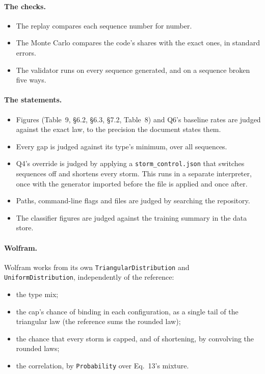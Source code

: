 \documentclass[11pt,a4paper]{article}
\begin{document}
\paragraph{The checks.}
\begin{itemize}[leftmargin=*,nosep]
\item The replay compares each sequence number for number.
\item The Monte Carlo compares the code's shares with the exact ones, in standard errors.
\item The validator runs on every sequence generated, and on a sequence broken five ways.
\end{itemize}

\paragraph{The statements.}
\begin{itemize}[leftmargin=*,nosep]
\item Figures (Table~9, \S6.2, \S6.3, \S7.2, Table~8) and Q6's baseline rates are judged
  against the exact law, to the precision the document states them.
\item Every gap is judged against its type's minimum, over all \bmReplayN{} sequences.
\item Q4's override is judged by applying a \texttt{storm\_control.json} that switches
  sequences off and shortens every storm. This runs in a separate interpreter, once with
  the generator imported before the file is applied and once after.
\item Paths, command-line flags and files are judged by searching the repository.
\item The classifier figures are judged against the training summary in the data store.
\end{itemize}

\paragraph{Wolfram.} Wolfram works from its own \texttt{TriangularDistribution} and
\texttt{UniformDistribution}, independently of the reference:
\begin{itemize}[leftmargin=*,nosep]
\item the type mix;
\item the cap's chance of binding in each configuration, as a single tail of the
  triangular law (the reference sums the rounded law);
\item the chance that every storm is capped, and of shortening, by convolving the rounded
  laws;
\item the correlation, by \texttt{Probability} over Eq.~13's mixture.
\end{itemize}
\end{document}
